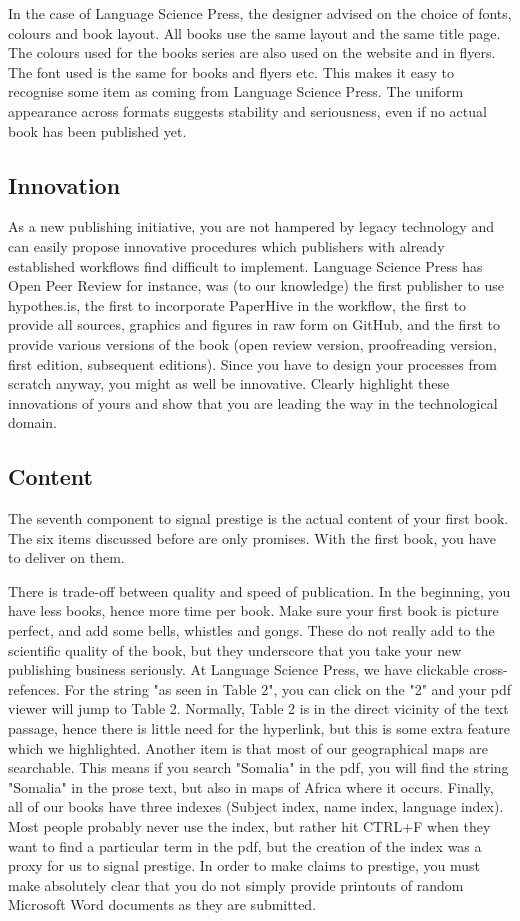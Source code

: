 \documentclass[guidelines,nonflat,modfonts] {langsci/langscibook}
\begin{document}
In the case of Language Science Press, the designer advised on the choice of fonts, colours and book layout. All books use the same layout and the same title page. The colours used for the books series are also used on the website and in flyers. The font used is the same for books and flyers etc. This makes it easy to recognise some item as coming from Language Science Press. The uniform appearance across formats suggests stability and seriousness, even if no actual book has been published yet. 

\subsection{Innovation}
As a new publishing initiative, you are not hampered by legacy technology and can easily propose innovative procedures which publishers with already established workflows find difficult to implement. Language Science Press has Open Peer Review for instance, was (to our knowledge) the first publisher to use hypothes.is, the first to incorporate PaperHive in the workflow, the first to provide all sources, graphics and figures in raw form on GitHub, and the first to provide various versions of the book (open review version, proofreading version, first edition, subsequent editions). Since you have to design your processes from scratch anyway, you might as well be innovative. Clearly highlight these innovations of yours and show that you are leading the way in the technological domain. 

 

\subsection{Content}
The seventh component to signal prestige is the actual content of your first book. The six items discussed before are only promises. With the first book, you have to deliver on them. 

There is trade-off between quality and speed of publication. In the beginning, you have less books, hence more time per book. Make sure your first book is picture perfect, and add some bells, whistles and gongs. These do not really add to the scientific quality of the book, but they underscore that you take your new publishing business seriously. At Language Science Press, we have clickable cross-refences. For the string "as seen in Table 2", you can click on the "2" and your pdf viewer will jump to Table 2. Normally, Table 2 is in the direct vicinity of the text passage, hence there is little need for the hyperlink, but this is some extra feature which we highlighted. Another item is that most of our geographical maps are searchable. This means if you search "Somalia" in the pdf, you will find the string "Somalia" in the prose text, but also in maps of Africa where it occurs. Finally, all of our books have three indexes (Subject index, name index, language index). Most people probably never use the index, but rather hit CTRL+F when they want to find a particular term in the pdf, but the creation of the index was a proxy for us to signal prestige. In order to make claims to prestige, you must make absolutely clear that you do not simply provide printouts of random Microsoft Word documents as they are submitted. 
\end{document}
